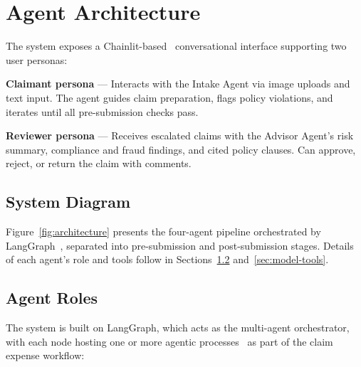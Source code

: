 \documentclass{article}
\begin{document}
\section{Agent Architecture}
\label{sec:architecture}

The system exposes a Chainlit-based~\cite{chainlit2024} conversational interface supporting two user personas:

\textbf{Claimant persona} --- Interacts with the Intake Agent via image uploads and text input. The agent guides claim preparation, flags policy violations, and iterates until all pre-submission checks pass.

\textbf{Reviewer persona} --- Receives escalated claims with the Advisor Agent's risk summary, compliance and fraud findings, and cited policy clauses. Can approve, reject, or return the claim with comments.

\subsection{System Diagram}
\label{sec:system-diagram}

Figure~\ref{fig:architecture} presents the four-agent pipeline orchestrated by LangGraph~\cite{langgraph2024}, separated into pre-submission and post-submission stages. Details of each agent's role and tools follow in Sections~\ref{sec:agent-roles} and~\ref{sec:model-tools}.

\subsection{Agent Roles}
\label{sec:agent-roles}

The system is built on LangGraph, which acts as the multi-agent orchestrator, with each node hosting one or more agentic processes~\cite{anthropic2024agents} as part of the claim expense workflow:
\end{document}
